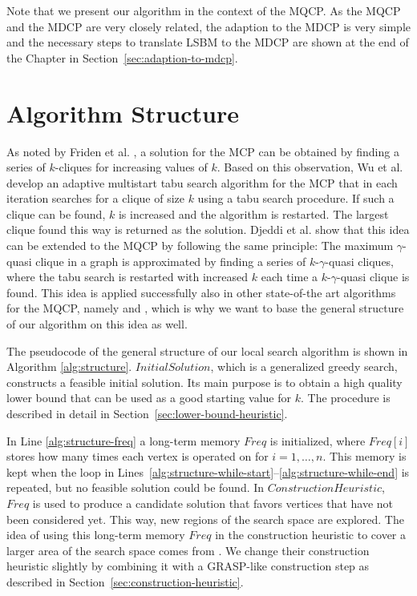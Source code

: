\documentclass[draft,final]{vutinfth} %
\begin{document}
Note that we present our algorithm in the context of the MQCP. As the MQCP and the MDCP are very closely related, the adaption to the MDCP is very simple and the necessary steps to translate LSBM to the MDCP are shown at the end of the Chapter in Section~\ref{sec:adaption-to-mdcp}. 

\section{Algorithm Structure} \label{sec:algorithm-structure}

As noted by Friden et al. \cite{Friden1989}, a solution for the MCP can be obtained by finding a series of $k$-cliques for increasing values of $k$. Based on this observation, Wu et al. \cite{WuH13} develop an adaptive multistart tabu search algorithm for the MCP that in each iteration searches for a clique of size $k$ using a tabu search procedure. If such a clique can be found, $k$ is increased and the algorithm is restarted. The largest clique found this way is returned as the solution. Djeddi et al. \cite{djeddi_extension_2019} show that this idea can be extended to the MQCP by following the same principle: The maximum $\gamma$-quasi clique in a graph is approximated by finding a series of $k$-$\gamma$-quasi cliques, where the tabu search is restarted with increased $k$ each time a $k$-$\gamma$-quasi clique is found. This idea is applied successfully also in other state-of-the art algorithms for the MQCP, namely \cite{zhou_opposition-based_2020} and \cite{chen_nuqclq_2021}, which is why we want to base the general structure of our algorithm on this idea as well. 

The pseudocode of the general structure of our local search algorithm is shown in Algorithm \ref{alg:structure}.
$\mathit{InitialSolution}$, which is a generalized greedy search, constructs a feasible initial solution. Its main purpose is to obtain a high quality lower bound that can be used as a good starting value for $k$. The procedure is described in detail in Section~\ref{sec:lower-bound-heuristic}.

In Line \ref{alg:structure-freq} a long-term memory $\mathit{Freq}$ is initialized, where $\mathit{Freq[i]}$ stores how many times each vertex is operated on for $i=1,\dots,n$. This memory is kept when the loop in Lines~\ref{alg:structure-while-start}--\ref{alg:structure-while-end} is repeated, but no feasible solution could be found. In $\mathit{ConstructionHeuristic}$, $\mathit{Freq}$ is used to produce a candidate solution that favors vertices that have not been considered yet. This way, new regions of the search space are explored. The idea of using this long-term memory $\mathit{Freq}$ in the construction heuristic to cover a larger area of the search space comes from \cite{chen_nuqclq_2021}. We change their construction heuristic slightly by combining it with a GRASP-like construction step as described in Section~\ref{sec:construction-heuristic}. 
\end{document}
